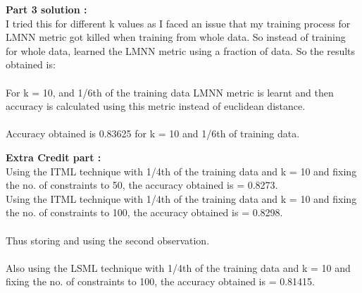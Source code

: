 \documentclass[a4paper,11pt]{article}
\begin{document}
\begin{mlsolution}
\textbf{Part 3 solution :}\\

I tried this for different k values as I faced an issue that my training process for LMNN metric got killed when training from whole data. So instead of training for whole data, learned the LMNN metric using a fraction of data. So the results obtained is:\\\\For k = 10, and 1/6th of the training data LMNN metric is learnt and then accuracy is calculated using this metric instead of euclidean distance.\\\\Accuracy obtained is 0.83625 for k = 10 and 1/6th of training data.

\newpage

\textbf{Extra Credit part :}\\

Using the ITML technique with 1/4th of the training data and k = 10 and fixing the no. of constraints to 50, the accuracy obtained is = 0.8273.\\Using the ITML technique with 1/4th of the training data and k = 10 and fixing the no. of constraints to 100, the accuracy obtained is = 0.8298.\\\\Thus storing and using the second observation.
\\\\Also using the LSML technique with 1/4th of the training data and k = 10 and fixing the no. of constraints to 100, the accuracy obtained is =  0.81415.

\end{mlsolution}
\end{document}
